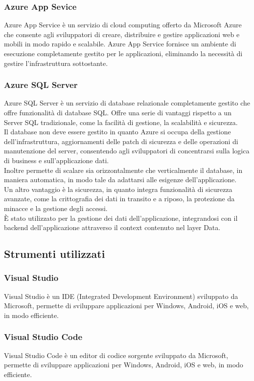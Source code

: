 \subsubsection{Azure App Sevice}
Azure App Service è un servizio di cloud computing offerto da Microsoft Azure che consente agli sviluppatori di creare, distribuire e gestire applicazioni web e mobili in modo rapido e scalabile. Azure App Service fornisce un ambiente di esecuzione completamente gestito per le applicazioni, eliminando la necessità di gestire l'infrastruttura sottostante.
\subsubsection{Azure SQL Server}
Azure SQL Server è un servizio di database relazionale completamente gestito che offre funzionalità di database SQL.
Offre una serie di vantaggi rispetto a un Server SQL tradizionale, come la facilità di gestione, la scalabilità e sicurezza.\\
Il database non deve essere gestito in quanto Azure si occupa della gestione dell'infrastruttura, aggiornamenti delle patch di sicurezza e delle operazioni di manutenzione del server, consentendo agli sviluppatori di concentrarsi sulla logica di business e sull'applicazione dati.\\
Inoltre permette di scalare sia orizzontalmente che verticalmente il database, in maniera automatica, in modo tale da adattarsi alle esigenze dell'applicazione.\\
Un altro vantaggio è la sicurezza, in quanto integra funzionalità di sicurezza avanzate, come la crittografia dei dati in transito e a riposo, la protezione da minacce e la gestione degli accessi.\\
È stato utilizzato per la gestione dei dati dell'applicazione, integrandosi con il backend dell'applicazione attraverso il context contenuto nel layer Data.\\
\subsection{Strumenti utilizzati}
\subsubsection{Visual Studio}
Visual Studio è un IDE (Integrated Development Environment) sviluppato da Microsoft, permette di sviluppare applicazioni per Windows, Android, iOS e web, in modo efficiente.
\subsubsection{Visual Studio Code}
Visual Studio Code è un editor di codice sorgente sviluppato da Microsoft, permette di sviluppare applicazioni per Windows, Android, iOS e web, in modo efficiente.